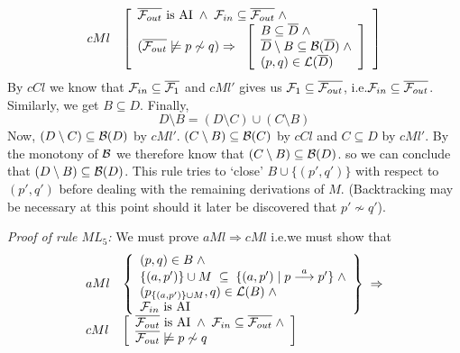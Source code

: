 \begin{theorem}[Soundness]
\begin{trivlist}
\[\begin{array}{ll}
cMl &
\left[
\begin{array}{l}
\overline{{\cal F}_{out}}  \mbox{ is AI} \;\wedge\;{\cal F}_{in}\subseteq\overline{{\cal F}_{out}}\;\wedge\\
(\overline{{\cal F}_{out}}\not\models p\not\sim q)\Rightarrow\;\;
\left[
\begin{array}{l}
B\subseteq \overline{D}\; \wedge\\
\overline{D}\setminus B\subseteq {\cal B}(\overline{D})\;\wedge\\
(p,q)\in{\cal L}(\overline{D})
\end{array}
\right]
\end{array}
\right]
\end{array}
\]
By $cCl$ we know that ${\cal F}_{in}\subseteq \overline{{\cal F}_{1}}$ and $cMl'$ gives us ${\cal F}_{1}\subseteq\overline{{\cal F}_{out}}$, i.e.\@ ${\cal F}_{in}\subseteq\overline{{\cal F}_{out}}$. Similarly, we get $B\subseteq D$. Finally,
\[
D\setminus B = (D\setminus C) \cup (C\setminus B)
\]
Now, $(D\setminus C)\subseteq{\cal B}(D)$ by $cMl'$. $(C\setminus B)\subseteq{\cal B}(C)$ by $cCl$ and $C\subseteq D$ by $cMl'$. By the monotony of $\cal B$ we therefore know that $(C\setminus B)\subseteq{\cal B}(D)$. so we can conclude that $(D\setminus B)\subseteq{\cal B}(D)$. This rule tries to `close' $B\cup\{(p',q')\}$ with respect to $(p',q')$ before dealing with the remaining derivations of $M$. (Backtracking may be necessary at this point should it later be discovered that $p'\not\sim q'$).

\item[\it Proof of rule\/ $ML_5$:]
We must prove $aMl\Rightarrow cMl$ i.e.\@ we must show that 
\[
\begin{array}{ll}
aMl &
\left\{
\begin{array}{l}
(p,q)\in B\;\wedge\\
\{(a,p')\}\cup M\;\subseteq\;\{(a,p')\mid p\stackrel{a}{\longrightarrow}p'\}\;\wedge\\
(p_{\{(a,p')\}\cup M},q)\in{\cal L}(B)\;\wedge\\
{\cal F}_{in} \mbox{ is AI}
\end{array}\right\}\;\Rightarrow\\

cMl &
\left[
\begin{array}{l}
\overline{{\cal F}_{out}}  \mbox{ is AI} \;\wedge\;{\cal F}_{in}\subseteq\overline{{\cal F}_{out}}\;\wedge\\
\overline{{\cal F}_{out}}\not\models p\not\sim q
\end{array}
\right]


\end{array}\]
\end{trivlist}
\end{theorem}
